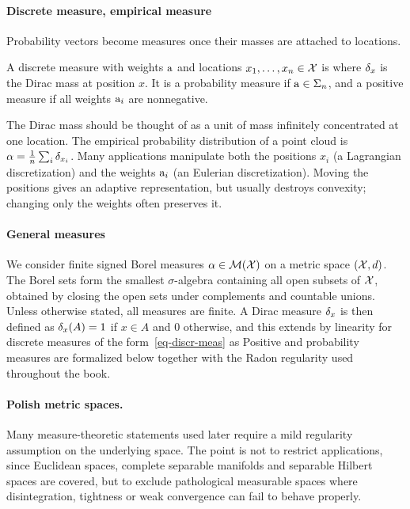 \paragraph{Discrete measure, empirical measure}

Probability vectors become measures once their masses are attached to locations.

\begin{defn}\label{def-discrete-measure}
	A discrete measure with weights $\mathrm{a}$ and locations $x_1,\dots,x_n\in\mathcal{X}$ is
	where $\delta_x$ is the Dirac mass at position $x$. It is a probability measure if $\mathrm{a}\in\Sigma_n$, and a positive measure if all weights $\mathrm{a}_i$ are nonnegative.
\end{defn}
The Dirac mass should be thought of as a unit of mass infinitely concentrated at one location.
%
The empirical probability distribution of a point cloud is $\alpha=\frac{1}{n}\sum_i \delta_{x_i}$.
%
Many applications manipulate both the positions $x_i$ (a Lagrangian discretization) and the weights $\mathrm{a}_i$ (an Eulerian discretization). Moving the positions gives an adaptive representation, but usually destroys convexity; changing only the weights often preserves it.


\paragraph{General measures}

We consider finite signed Borel measures $\alpha \in \mathcal{M}(\mathcal{X})$ on a metric space $(\mathcal{X},d)$. The Borel sets form the smallest $\sigma$-algebra containing all open subsets of $\mathcal{X}$, obtained by closing the open sets under complements and countable unions. Unless otherwise stated, all measures are finite.
%
A Dirac measure $\delta_x$ is then defined as $\delta_x(A)=1$ if $x \in A$ and $0$ otherwise, and this extends by linearity for discrete measures of the form~\eqref{eq-discr-meas} as
%
Positive and probability measures are formalized below together with the Radon regularity used throughout the book.

\paragraph{Polish metric spaces.}
Many measure-theoretic statements used later require a mild regularity assumption on the underlying space. The point is not to restrict applications, since Euclidean spaces, complete separable manifolds and separable Hilbert spaces are covered, but to exclude pathological measurable spaces where disintegration, tightness or weak convergence can fail to behave properly.

